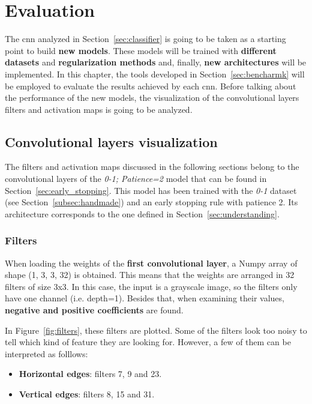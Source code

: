 \chapter{Evaluation}\label{sec:new_models}
The \gls{cnn} analyzed in Section~\ref{sec:classifier} is going to be taken as a starting point to build \textbf{new models}. These models will be trained with \textbf{different datasets} and \textbf{regularization methods} and, finally, \textbf{new architectures} will be implemented. In this chapter, the tools developed in Section~\ref{sec:bencharmk} will be employed to evaluate the results achieved by each \gls{cnn}. Before talking about the performance of the new models, the visualization of the convolutional layers filters and activation maps is going to be analyzed.

\section{Convolutional layers visualization}
The filters and activation maps discussed in the following sections belong to the convolutional layers of the \textit{0-1; Patience=2} model that can be found in Section~\ref{sec:early_stopping}. This model has been trained with the \textit{0-1} dataset (see Section~\ref{subsec:handmade}) and an early stopping rule with patience 2. Its architecture corresponds to the one defined in Section~\ref{sec:understanding}.

\subsection{Filters}
When loading the weights of the \textbf{first convolutional layer}, a Numpy array of shape (1, 3, 3, 32) is obtained. This means that the weights are arranged in 32 filters of size 3x3. In this case, the input is a grayscale image, so the filters only have one channel (i.e. depth=1). Besides that, when examining their values, \textbf{negative and positive coefficients} are found.

In Figure~\ref{fig:filters}, these filters are plotted. Some of the filters look too noisy to tell which kind of feature they are looking for. However, a few of them can be interpreted as folllows:
\begin{itemize}
	\item \textbf{Horizontal edges}: filters 7, 9 and 23.
	\item \textbf{Vertical edges}: filters 8, 15 and 31.	
\end{itemize}

